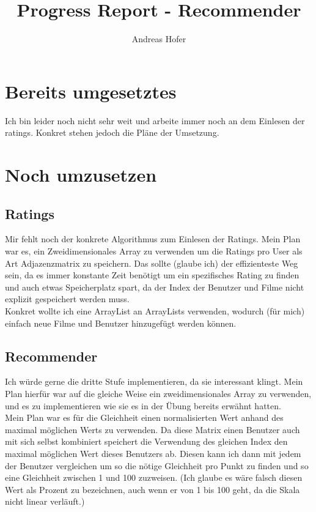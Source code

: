\documentclass{article}
\title{\vspace{-1cm}Progress Report - Recommender}
\author{Andreas Hofer}
\begin{document}
	\maketitle
	\section*{Bereits umgesetztes}
		Ich bin leider noch nicht sehr weit und arbeite immer noch an dem Einlesen der ratings. Konkret stehen jedoch die Pläne der Umsetzung.
	\section*{Noch umzusetzen}
		\subsection*{Ratings}
			Mir fehlt noch der konkrete Algorithmus zum Einlesen der Ratings. Mein Plan war es, ein Zweidimensionales Array zu verwenden um die Ratings pro User als Art Adjazenzmatrix zu speichern. Das sollte (glaube ich) der effizienteste Weg sein, da es immer konstante Zeit benötigt um ein spezifisches Rating zu finden und auch etwas Speicherplatz spart, da der Index der Benutzer und Filme nicht explizit gespeichert werden muss. \\
			Konkret wollte ich eine ArrayList an ArrayLists verwenden, wodurch (für mich) einfach neue Filme und Benutzer hinzugefügt werden können.
		\subsection*{Recommender}
			Ich würde gerne die dritte Stufe implementieren, da sie interessant klingt. Mein Plan hierfür war auf die gleiche Weise ein zweidimensionales Array zu verwenden, und es zu implementieren wie sie es in der Übung bereits erwähnt hatten. \\
			Mein Plan war es für die Gleichheit einen normalisierten Wert anhand des maximal möglichen Werts zu verwenden. Da diese Matrix einen Benutzer auch mit sich selbst kombiniert speichert die Verwendung des gleichen Index den maximal möglichen Wert dieses Benutzers ab. Diesen kann ich dann mit jedem der Benutzer vergleichen um so die nötige Gleichheit pro Punkt zu finden und so eine Gleichheit zwischen 1 und 100 zuzweisen. (Ich glaube es wäre falsch diesen Wert als Prozent zu bezeichnen, auch wenn er von 1 bis 100 geht, da die Skala nicht linear verläuft.)
\end{document}
